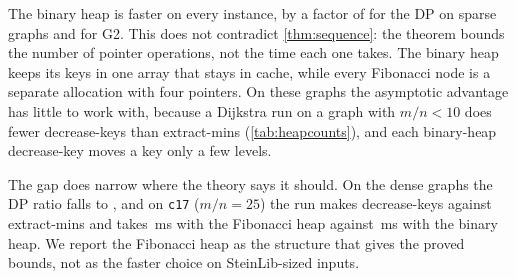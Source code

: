 \noindent The binary heap is faster on every instance, by a factor of  for the DP on sparse graphs and
 for G2. This does not contradict \cref{thm:sequence}: the theorem bounds the number of pointer
operations, not the time each one takes. The binary heap keeps its keys in one array that stays in cache, while every Fibonacci
node is a separate allocation with four pointers. On these graphs the asymptotic advantage has little to work with, because a
Dijkstra run on a graph with \(m/n<10\) does fewer decrease-keys than extract-mins (\cref{tab:heapcounts}), and each binary-heap
decrease-key moves a key only a few levels.

The gap does narrow where the theory says it should. On the dense graphs the DP ratio falls to , and
on \texttt{c17} (\(m/n=25\)) the run makes  decrease-keys against  extract-mins and
takes \,ms with the Fibonacci heap against \,ms with the binary heap. We report the
Fibonacci heap as the structure that gives the proved bounds, not as the faster choice on SteinLib-sized inputs.
